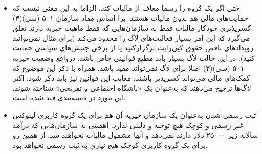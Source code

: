 \begin{itemize}
\item
حتی اگر  یک گروه را رسما معاف از مالیات کند، الزاما به این معنی نیست
که حمایت‌های مالی هم بدون مالیات هستند. برا اساس مفاد سازمان ۵۰۱ (سی)(۳) کسرپذیری
خودکار مالیات فقط به سازمان‌هایی که فقط ماهیت خیریه دارند تعلق می‌گیرد که این امر
بسیار فعالیت‌های لاگ را محدود می‌کند (برای مثال نمی‌توانید رویدادهای ناقض حقوق کپی‌رایت
برگزارکنید یا از برخی جنبش‌های سیاسی حمایت کنید). در این حالت لاگ بسیار باید مطیع قوانینی
خاص باشد. درواقع وضعیت خیریه ۵۰۱ (سی)(۳) اصلا برای لاگ نمی‌تواند مفید باشد.
همراه با ذکر این موضوع که کمک‌های مالی می‌تواند کسرپذیر باشند، معایب این قوانین نیز
باید ذکر شود. اکثر لاگ‌ها ترجیح می‌دهند که به‌عنوان یک «باشگاه اجتماعی و تفریحی» شناخته شوند.
این مورد در دسته‌بندی
قید شده است.

\item
ثبت رسمی شدن به‌عنوان یک سازمان خیریه آن هم برای یک گروه کاربری لینوکس غیر رسمی و کوچک
هیچ توجیه و دلیلی ندارد.  اهمیتی به سازمان‌هایی که درآمد سالانه زیر ۲۵۰۰۰ دلار دارند نمی‌دهد
و آنها مشمول مالیات نخواهند شد. از همین رو برای یک گروه کاربری کوچک هیچ نیازی به ثبت رسمی نخواهد بود.


\end{itemize}
